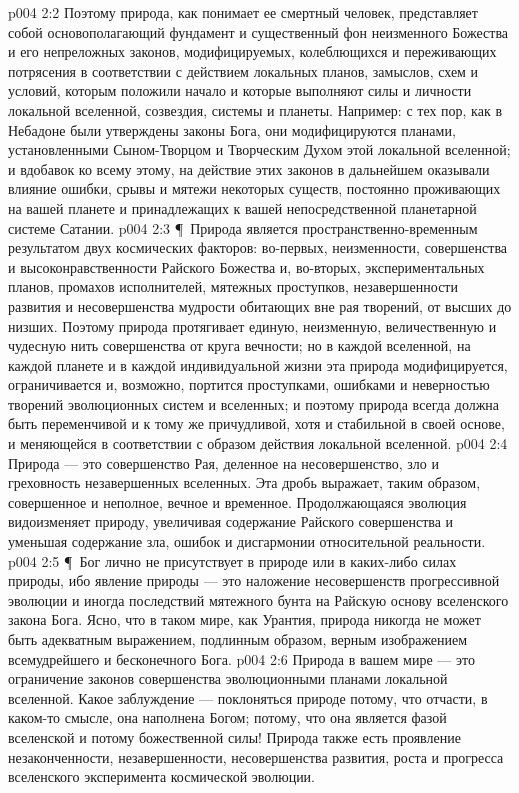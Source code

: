 \vs p004 2:2 Поэтому природа, как понимает ее смертный человек, представляет собой основополагающий фундамент и существенный фон неизменного Божества и его непреложных законов, модифицируемых, колеблющихся и переживающих потрясения в соответствии с действием локальных планов, замыслов, схем и условий, которым положили начало и которые выполняют силы и личности локальной вселенной, созвездия, системы и планеты. Например: с тех пор, как в Небадоне были утверждены законы Бога, они модифицируются планами, установленными Сыном\hyp{}Творцом и Творческим Духом этой локальной вселенной; и вдобавок ко всему этому, на действие этих законов в дальнейшем оказывали влияние ошибки, срывы и мятежи некоторых существ, постоянно проживающих на вашей планете и принадлежащих к вашей непосредственной планетарной системе Сатании.
\vs p004 2:3 \P\ Природа является пространственно\hyp{}временным результатом двух космических факторов: во\hyp{}первых, неизменности, совершенства и высоконравственности Райского Божества и, во\hyp{}вторых, экспериментальных планов, промахов исполнителей, мятежных проступков, незавершенности развития и несовершенства мудрости обитающих вне рая творений, от высших до низших. Поэтому природа протягивает единую, неизменную, величественную и чудесную нить совершенства от круга вечности; но в каждой вселенной, на каждой планете и в каждой индивидуальной жизни эта природа модифицируется, ограничивается и, возможно, портится проступками, ошибками и неверностью творений эволюционных систем и вселенных; и поэтому природа всегда должна быть переменчивой и к тому же причудливой, хотя и стабильной в своей основе, и меняющейся в соответствии с образом действия локальной вселенной.
\vs p004 2:4 Природа --- это совершенство Рая, деленное на несовершенство, зло и греховность незавершенных вселенных. Эта дробь выражает, таким образом, совершенное и неполное, вечное и временное. Продолжающаяся эволюция видоизменяет природу, увеличивая содержание Райского совершенства и уменьшая содержание зла, ошибок и дисгармонии относительной реальности.
\vs p004 2:5 \P\ Бог лично не присутствует в природе или в каких\hyp{}либо силах природы, ибо явление природы --- это наложение несовершенств прогрессивной эволюции и иногда последствий мятежного бунта на Райскую основу вселенского закона Бога. Ясно, что в таком мире, как Урантия, природа никогда не может быть адекватным выражением, подлинным образом, верным изображением всемудрейшего и бесконечного Бога.
\vs p004 2:6 Природа в вашем мире --- это ограничение законов совершенства эволюционными планами локальной вселенной. Какое заблуждение --- поклоняться природе потому, что отчасти, в каком\hyp{}то смысле, она наполнена Богом; потому, что она является фазой вселенской и потому божественной силы! Природа также есть проявление незаконченности, незавершенности, несовершенства развития, роста и прогресса вселенского эксперимента космической эволюции.
